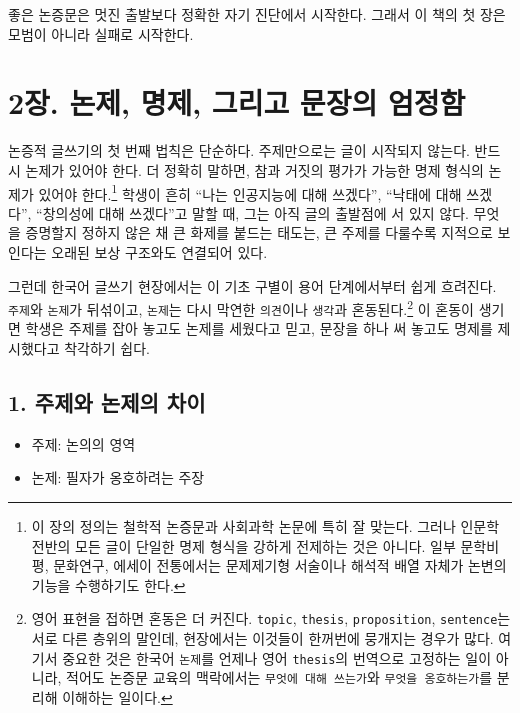 좋은 논증문은 멋진 출발보다 정확한 자기 진단에서 시작한다. 그래서 이 책의 첫 장은 모범이 아니라 실패로 시작한다.

\chapter{2장. 논제, 명제, 그리고 문장의 엄정함}\label{2uxc7a5-uxb17cuxc81c-uxba85uxc81c-uxadf8uxb9acuxace0-uxbb38uxc7a5uxc758-uxc5c4uxc815uxd568}

논증적 글쓰기의 첫 번째 법칙은 단순하다. 주제만으로는 글이 시작되지 않는다. 반드시 논제가 있어야 한다. 더 정확히 말하면, 참과 거짓의 평가가 가능한 명제 형식의 논제가 있어야 한다.\footnote{이 장의 정의는 철학적 논증문과 사회과학 논문에 특히 잘 맞는다. 그러나 인문학 전반의 모든 글이 단일한 명제 형식을 강하게 전제하는 것은 아니다. 일부 문학비평, 문화연구, 에세이 전통에서는 문제제기형 서술이나 해석적 배열 자체가 논변의 기능을 수행하기도 한다.} 학생이 흔히 ``나는 인공지능에 대해 쓰겠다'', ``낙태에 대해 쓰겠다'', ``창의성에 대해 쓰겠다''고 말할 때, 그는 아직 글의 출발점에 서 있지 않다. 무엇을 증명할지 정하지 않은 채 큰 화제를 붙드는 태도는, 큰 주제를 다룰수록 지적으로 보인다는 오래된 보상 구조와도 연결되어 있다.

그런데 한국어 글쓰기 현장에서는 이 기초 구별이 용어 단계에서부터 쉽게 흐려진다. \texttt{주제}와 \texttt{논제}가 뒤섞이고, \texttt{논제}는 다시 막연한 \texttt{의견}이나 \texttt{생각}과 혼동된다.\footnote{영어 표현을 접하면 혼동은 더 커진다. \texttt{topic}, \texttt{thesis}, \texttt{proposition}, \texttt{sentence}는 서로 다른 층위의 말인데, 현장에서는 이것들이 한꺼번에 뭉개지는 경우가 많다. 여기서 중요한 것은 한국어 \texttt{논제}를 언제나 영어 \texttt{thesis}의 번역으로 고정하는 일이 아니라, 적어도 논증문 교육의 맥락에서는 \texttt{무엇에\ 대해\ 쓰는가}와 \texttt{무엇을\ 옹호하는가}를 분리해 이해하는 일이다.} 이 혼동이 생기면 학생은 주제를 잡아 놓고도 논제를 세웠다고 믿고, 문장을 하나 써 놓고도 명제를 제시했다고 착각하기 쉽다.

\section{1. 주제와 논제의 차이}\label{1-uxc8fcuxc81cuxc640-uxb17cuxc81cuxc758-uxcc28uxc774}

\begin{itemize}
\tightlist
\item
  주제: 논의의 영역
\item
  논제: 필자가 옹호하려는 주장
\end{itemize}

